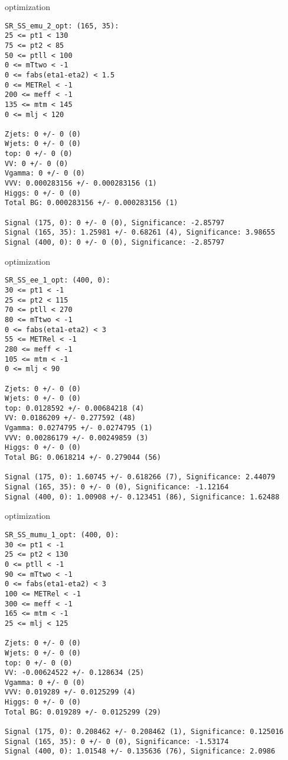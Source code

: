 \begin{frame}[fragile]{optimization}
\tiny
\begin{verbatim}
SR_SS_emu_2_opt: (165, 35):
25 <= pt1 < 130
75 <= pt2 < 85
50 <= ptll < 100
0 <= mTtwo < -1
0 <= fabs(eta1-eta2) < 1.5
0 <= METRel < -1
200 <= meff < -1
135 <= mtm < 145
0 <= mlj < 120

Zjets: 0 +/- 0 (0)
Wjets: 0 +/- 0 (0)
top: 0 +/- 0 (0)
VV: 0 +/- 0 (0)
Vgamma: 0 +/- 0 (0)
VVV: 0.000283156 +/- 0.000283156 (1)
Higgs: 0 +/- 0 (0)
Total BG: 0.000283156 +/- 0.000283156 (1)

Signal (175, 0): 0 +/- 0 (0), Significance: -2.85797
Signal (165, 35): 1.25981 +/- 0.68261 (4), Significance: 3.98655
Signal (400, 0): 0 +/- 0 (0), Significance: -2.85797
\end{verbatim}
\end{frame}

\begin{frame}[fragile]{optimization}
\tiny
\begin{verbatim}
SR_SS_ee_1_opt: (400, 0):
30 <= pt1 < -1
25 <= pt2 < 115
70 <= ptll < 270
80 <= mTtwo < -1
0 <= fabs(eta1-eta2) < 3
55 <= METRel < -1
280 <= meff < -1
105 <= mtm < -1
0 <= mlj < 90

Zjets: 0 +/- 0 (0)
Wjets: 0 +/- 0 (0)
top: 0.0128592 +/- 0.00684218 (4)
VV: 0.0186209 +/- 0.277592 (48)
Vgamma: 0.0274795 +/- 0.0274795 (1)
VVV: 0.00286179 +/- 0.00249859 (3)
Higgs: 0 +/- 0 (0)
Total BG: 0.0618214 +/- 0.279044 (56)

Signal (175, 0): 1.60745 +/- 0.618266 (7), Significance: 2.44079
Signal (165, 35): 0 +/- 0 (0), Significance: -1.12164
Signal (400, 0): 1.00908 +/- 0.123451 (86), Significance: 1.62488
\end{verbatim}
\end{frame}

\begin{frame}[fragile]{optimization}
\tiny
\begin{verbatim}
SR_SS_mumu_1_opt: (400, 0):
30 <= pt1 < -1
25 <= pt2 < 130
0 <= ptll < -1
90 <= mTtwo < -1
0 <= fabs(eta1-eta2) < 3
100 <= METRel < -1
300 <= meff < -1
165 <= mtm < -1
25 <= mlj < 125

Zjets: 0 +/- 0 (0)
Wjets: 0 +/- 0 (0)
top: 0 +/- 0 (0)
VV: -0.00624522 +/- 0.128634 (25)
Vgamma: 0 +/- 0 (0)
VVV: 0.019289 +/- 0.0125299 (4)
Higgs: 0 +/- 0 (0)
Total BG: 0.019289 +/- 0.0125299 (29)

Signal (175, 0): 0.208462 +/- 0.208462 (1), Significance: 0.125016
Signal (165, 35): 0 +/- 0 (0), Significance: -1.53174
Signal (400, 0): 1.01548 +/- 0.135636 (76), Significance: 2.0986
\end{verbatim}
\end{frame}

